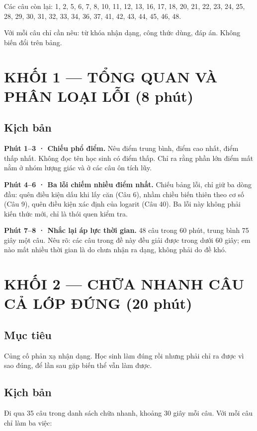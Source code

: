 \documentclass[11pt, a4paper]{article}
\begin{document}
Các câu còn lại: 1, 2, 5, 6, 7, 8, 10, 11, 12, 13, 16, 17, 18, 20, 21, 22, 23, 24, 25, 28, 29, 30, 31, 32, 33, 34, 36, 37, 41, 42, 43, 44, 45, 46, 48.

Với mỗi câu chỉ cần nêu: từ khóa nhận dạng, công thức dùng, đáp án. Không biến đổi trên bảng.

\section{KHỐI 1 — TỔNG QUAN VÀ PHÂN LOẠI LỖI (8 phút)}

\subsection{Kịch bản}

\textbf{Phút 1–3 · Chiếu phổ điểm.} Nêu điểm trung bình, điểm cao nhất, điểm thấp nhất. Không đọc tên học sinh có điểm thấp. Chỉ ra rằng phần lớn điểm mất nằm ở nhóm lượng giác và ở các câu ôn tích lũy.

\textbf{Phút 4–6 · Ba lỗi chiếm nhiều điểm nhất.} Chiếu bảng lỗi, chỉ giữ ba dòng đầu: quên điều kiện dấu khi lấy căn (Câu 6), nhầm chiều biến thiên theo cơ số (Câu 9), quên điều kiện xác định của logarit (Câu 40). Ba lỗi này không phải kiến thức mới, chỉ là thói quen kiểm tra.

\textbf{Phút 7–8 · Nhắc lại áp lực thời gian.} 48 câu trong 60 phút, trung bình 75 giây một câu. Nêu rõ: các câu trong đề này đều giải được trong dưới 60 giây; em nào mất nhiều thời gian là do chưa nhận ra dạng, không phải do đề khó.

\section{KHỐI 2 — CHỮA NHANH CÂU CẢ LỚP ĐÚNG (20 phút)}

\subsection{Mục tiêu}

Củng cố phản xạ nhận dạng. Học sinh làm đúng rồi nhưng phải chỉ ra được vì sao đúng, để lần sau gặp biến thể vẫn làm được.

\subsection{Kịch bản}

Đi qua 35 câu trong danh sách chữa nhanh, khoảng 30 giây mỗi câu. Với mỗi câu chỉ làm ba việc:
\end{document}
